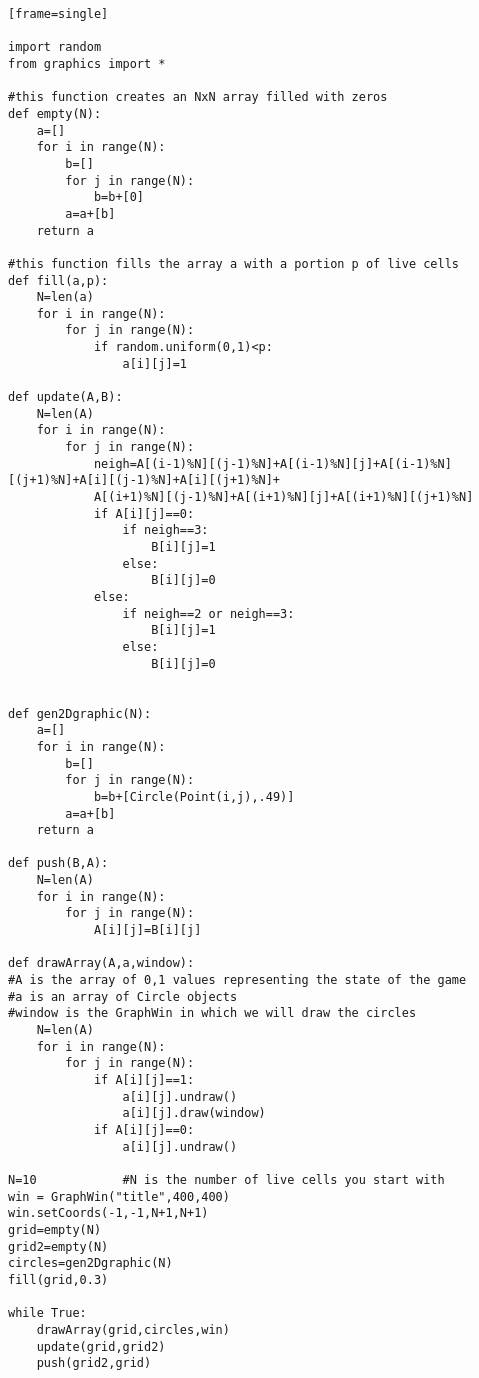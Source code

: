 \begin{verbatim}[frame=single]

import random
from graphics import *

#this function creates an NxN array filled with zeros
def empty(N):
    a=[]
    for i in range(N):
        b=[]
        for j in range(N):
            b=b+[0]
        a=a+[b]
    return a

#this function fills the array a with a portion p of live cells
def fill(a,p):
    N=len(a)
    for i in range(N):
        for j in range(N):
            if random.uniform(0,1)<p:
                a[i][j]=1

def update(A,B):
    N=len(A)
    for i in range(N):
        for j in range(N):
            neigh=A[(i-1)%N][(j-1)%N]+A[(i-1)%N][j]+A[(i-1)%N][(j+1)%N]+A[i][(j-1)%N]+A[i][(j+1)%N]+
            A[(i+1)%N][(j-1)%N]+A[(i+1)%N][j]+A[(i+1)%N][(j+1)%N]
            if A[i][j]==0:
                if neigh==3:
                    B[i][j]=1
                else:
                    B[i][j]=0
            else:
                if neigh==2 or neigh==3:
                    B[i][j]=1
                else:
                    B[i][j]=0


def gen2Dgraphic(N):
    a=[]
    for i in range(N):
        b=[]
        for j in range(N):
            b=b+[Circle(Point(i,j),.49)]
        a=a+[b]
    return a

def push(B,A):
    N=len(A)
    for i in range(N):
        for j in range(N):
            A[i][j]=B[i][j]
            
def drawArray(A,a,window):
#A is the array of 0,1 values representing the state of the game
#a is an array of Circle objects
#window is the GraphWin in which we will draw the circles
    N=len(A)
    for i in range(N):
        for j in range(N):
            if A[i][j]==1:
                a[i][j].undraw()
                a[i][j].draw(window)
            if A[i][j]==0:
                a[i][j].undraw()

N=10            #N is the number of live cells you start with
win = GraphWin("title",400,400)
win.setCoords(-1,-1,N+1,N+1)
grid=empty(N)
grid2=empty(N)
circles=gen2Dgraphic(N)
fill(grid,0.3)

while True:
    drawArray(grid,circles,win)
    update(grid,grid2)
    push(grid2,grid)
\end{verbatim}




